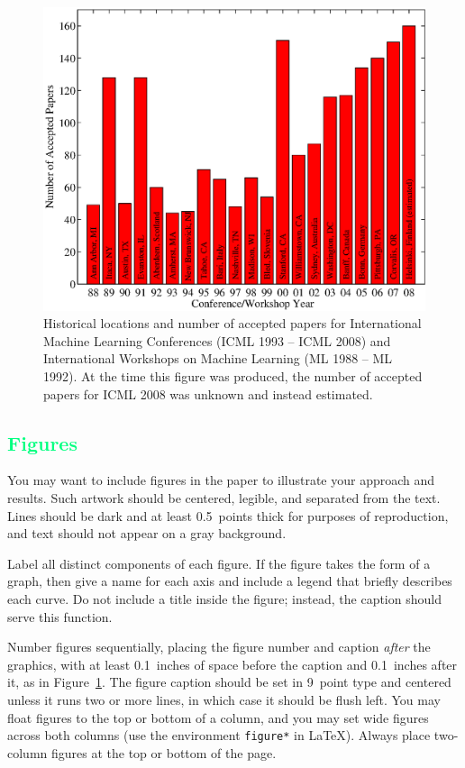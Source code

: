 \documentclass{article}
\newcommand{\csubsection}[1]{\subsection{\textcolor{springgreen}{#1}}}
\begin{document}
\begin{figure}[ht]
\vskip 0.2in
\begin{center}
\centerline{\includegraphics[width=\columnwidth]{icml_numpapers}}
\caption{Historical locations and number of accepted papers for International
Machine Learning Conferences (ICML 1993 -- ICML 2008) and International
Workshops on Machine Learning (ML 1988 -- ML 1992). At the time this figure was
produced, the number of accepted papers for ICML 2008 was unknown and instead
estimated.}
\label{icml-historical}
\end{center}
\vskip -0.2in
\end{figure}

\csubsection{Figures}

You may want to include figures in the paper to illustrate
your approach and results. Such artwork should be centered,
legible, and separated from the text. Lines should be dark and at
least 0.5~points thick for purposes of reproduction, and text should
not appear on a gray background.

Label all distinct components of each figure. If the figure takes the
form of a graph, then give a name for each axis and include a legend
that briefly describes each curve. Do not include a title inside the
figure; instead, the caption should serve this function.

Number figures sequentially, placing the figure number and caption
\emph{after} the graphics, with at least 0.1~inches of space before
the caption and 0.1~inches after it, as in
Figure~\ref{icml-historical}. The figure caption should be set in
9~point type and centered unless it runs two or more lines, in which
case it should be flush left. You may float figures to the top or
bottom of a column, and you may set wide figures across both columns
(use the environment \texttt{figure*} in \LaTeX). Always place
two-column figures at the top or bottom of the page.
\end{document}
